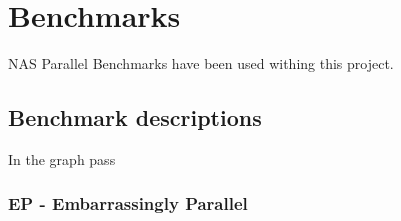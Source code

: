 \chapter{Benchmarks} \label{benchmarks}

NAS Parallel Benchmarks have been used withing this project.

\section{Benchmark descriptions} 
In the graph pass

\subsection{EP - Embarrassingly Parallel}


